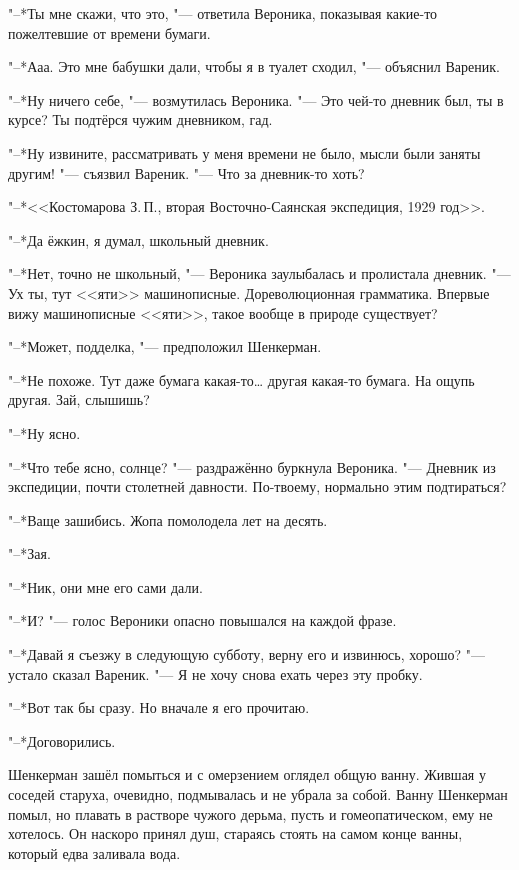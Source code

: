 "--*Ты мне скажи, что это, "--- ответила Вероника, показывая какие-то пожелтевшие от времени бумаги.

"--*Ааа.
Это мне бабушки дали, чтобы я в туалет сходил, "--- объяснил Вареник.

"--*Ну ничего себе, "--- возмутилась Вероника.
"--- Это чей-то дневник был, ты в курсе?
Ты подтёрся чужим дневником, гад.

"--*Ну извините, рассматривать у меня времени не было, мысли были заняты другим! "--- съязвил Вареник.
"--- Что за дневник-то хоть?

"--*<<Костомарова З.\,П., вторая Восточно-Саянская экспедиция, 1929 год>>.

"--*Да ёжкин, я думал, школьный дневник.

"--*Нет, точно не школьный, "--- Вероника заулыбалась и пролистала дневник.
"--- Ух ты, тут <<яти>> машинописные.
Дореволюционная грамматика.
Впервые вижу машинописные <<яти>>, такое вообще в природе существует?

"--*Может, подделка, "--- предположил Шенкерман.

"--*Не похоже.
Тут даже бумага какая-то\dots{} другая какая-то бумага.
На ощупь другая.
Зай, слышишь?

"--*Ну ясно.

"--*Что тебе ясно, солнце? "--- раздражённо буркнула Вероника.
"--- Дневник из экспедиции, почти столетней давности.
По-твоему, нормально этим подтираться?

"--*Ваще зашибись.
Жопа помолодела лет на десять.

"--*Зая.

"--*Ник, они мне его сами дали.

"--*И? "--- голос Вероники опасно повышался на каждой фразе.

"--*Давай я съезжу в следующую субботу, верну его и извинюсь, хорошо? "--- устало сказал Вареник.
"--- Я не хочу снова ехать через эту пробку.

"--*Вот так бы сразу.
Но вначале я его прочитаю.

"--*Договорились.

\asterism

\textspace

Шенкерман зашёл помыться и с омерзением оглядел общую ванну.
Жившая у соседей старуха, очевидно, подмывалась и не убрала за собой.
Ванну Шенкерман помыл, но плавать в растворе чужого дерьма, пусть и гомеопатическом, ему не хотелось.
Он наскоро принял душ, стараясь стоять на самом конце ванны, который едва заливала вода.

